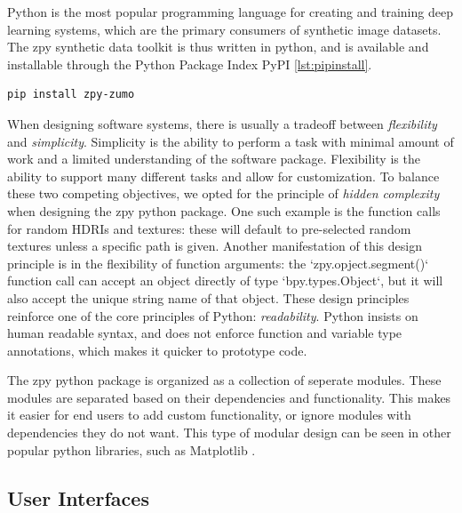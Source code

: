 \documentclass{article}
\begin{document}
Python is the most popular programming language for creating and training deep learning systems, which are the primary consumers of synthetic image datasets. The zpy synthetic data toolkit is thus written in python, and is available and installable through the Python Package Index PyPI \ref{lst:pipinstall}.

\begin{lstlisting}[language=bash,caption={Installing the zpy python module.},label={lst:pipinstall}]
pip install zpy-zumo
\end{lstlisting}

When designing software systems, there is usually a tradeoff between \emph{flexibility} and \emph{simplicity}. Simplicity is the ability to perform a task with minimal amount of work and a limited understanding of the software package. Flexibility is the ability to support many different tasks and allow for customization. To balance these two competing objectives, we opted for the principle of \emph{hidden complexity} when designing the zpy python package. One such example is the function calls for random HDRIs and textures: these will default to pre-selected random textures unless a specific path is given. Another manifestation of this design principle is in the flexibility of function arguments: the `zpy.opject.segment()` function call can accept an object directly of type `bpy.types.Object`, but it will also accept the unique string name of that object. These design principles reinforce one of the core principles of Python: \emph{readability}. Python insists on human readable syntax, and does not enforce function and variable type annotations, which makes it quicker to prototype code.


The zpy python package is organized as a collection of seperate modules. These modules are separated based on their dependencies and functionality. This makes it easier for end users to add custom functionality, or ignore modules with dependencies they do not want. This type of modular design can be seen in other popular python libraries, such as Matplotlib \cite{Hunter:2007}.

\subsection{User Interfaces}
\label{sec:userinterfaces}
\end{document}
